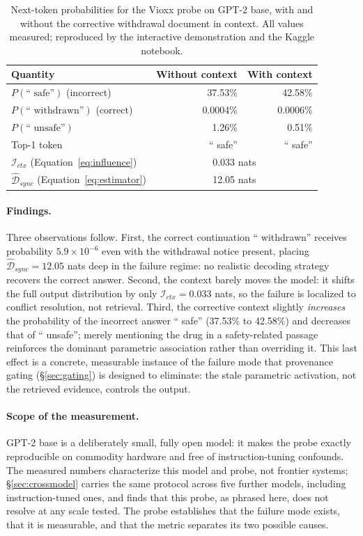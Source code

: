 \documentclass[manuscript, screen, review]{jair}
\begin{document}
\begin{table}[h]
\centering
\caption{Next-token probabilities for the Vioxx probe on GPT-2 base, with and without the corrective withdrawal document in context. All values measured; reproduced by the interactive demonstration and the Kaggle notebook.}
\label{tab:vioxx_results}
\small
\begin{tabular}{@{}lrr@{}}
\toprule
\textbf{Quantity} & \textbf{Without context} & \textbf{With context} \\
\midrule
$P(\text{`` safe''})$ (incorrect) & 37.53\% & 42.58\% \\
$P(\text{`` withdrawn''})$ (correct) & 0.0004\% & 0.0006\% \\
$P(\text{`` unsafe''})$ & 1.26\% & 0.51\% \\
Top-1 token & `` safe'' & `` safe'' \\
\midrule
$\mathcal{I}_{ctx}$ (Equation~\ref{eq:influence}) & \multicolumn{2}{c}{0.033 nats} \\
$\widehat{\mathcal{D}}_{sync}$ (Equation~\ref{eq:estimator}) & \multicolumn{2}{c}{12.05 nats} \\
\bottomrule
\end{tabular}
\end{table}

\paragraph{Findings.} Three observations follow. First, the correct continuation `` withdrawn'' receives probability $5.9 \times 10^{-6}$ even with the withdrawal notice present, placing $\widehat{\mathcal{D}}_{sync} = 12.05$ nats deep in the failure regime: no realistic decoding strategy recovers the correct answer. Second, the context barely moves the model: it shifts the full output distribution by only $\mathcal{I}_{ctx} = 0.033$ nats, so the failure is localized to conflict resolution, not retrieval. Third, the corrective context slightly \textit{increases} the probability of the incorrect answer `` safe'' (37.53\% to 42.58\%) and decreases that of `` unsafe''; merely mentioning the drug in a safety-related passage reinforces the dominant parametric association rather than overriding it. This last effect is a concrete, measurable instance of the failure mode that provenance gating (\S\ref{sec:gating}) is designed to eliminate: the stale parametric activation, not the retrieved evidence, controls the output.

\paragraph{Scope of the measurement.} GPT-2 base is a deliberately small, fully open model: it makes the probe exactly reproducible on commodity hardware and free of instruction-tuning confounds. The measured numbers characterize this model and probe, not frontier systems; \S\ref{sec:crossmodel} carries the same protocol across five further models, including instruction-tuned ones, and finds that this probe, as phrased here, does not resolve at any scale tested. The probe establishes that the failure mode exists, that it is measurable, and that the metric separates its two possible causes.
\end{document}

